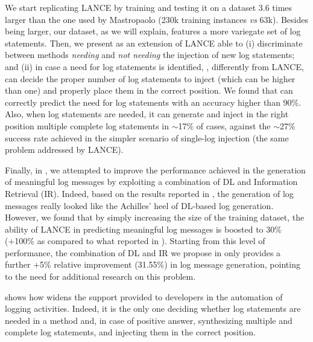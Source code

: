 We start replicating LANCE by training and testing it on a dataset 3.6 times larger than the one used by Mastropaolo \etal \cite{mastropaolo2022using} (230k training instances \emph{vs} 63k). Besides being larger, our dataset, as we will explain, features a more variegate set of log statements. Then, we present \approach as an extension of LANCE able to (i) discriminate between methods \emph{needing} and \emph{not needing} the injection of new log statements; and (ii) in case a need for log statements is identified, \approach, differently from LANCE, can decide the proper number of log statements to inject (which can be higher than one) and properly place them in the correct position. We found that \approach can correctly predict the need for log statements with an accuracy higher than 90\%. Also, when log statements are needed, it can generate and inject in the right position multiple complete log statements in $\sim$17\% of cases, against the $\sim$27\% success rate achieved in the simpler scenario of single-log injection (\ie the same problem addressed by LANCE).   

Finally, in \approach, we attempted to improve the performance achieved in the generation of meaningful log messages by exploiting a combination of DL and Information Retrieval (IR). Indeed, based on the results reported in \cite{mastropaolo2022using}, the generation of log messages really looked like the Achilles' heel of DL-based log generation. However, we found that by simply increasing the size of the training dataset, the ability of LANCE in predicting meaningful log messages is boosted to 30\% (+100\% as compared to what reported in \cite{mastropaolo2022using}). Starting from this level of performance, the combination of DL and IR we propose in \approach only provides a further +5\% relative improvement (31.55\%) in log message generation, pointing to the need for additional research on this problem.

 shows how \approach widens the support provided to developers in the automation of logging activities. Indeed, it is the only one deciding whether log statements are needed in a method and, in case of positive answer, synthesizing multiple and complete log statements, and injecting them in the correct position. 


